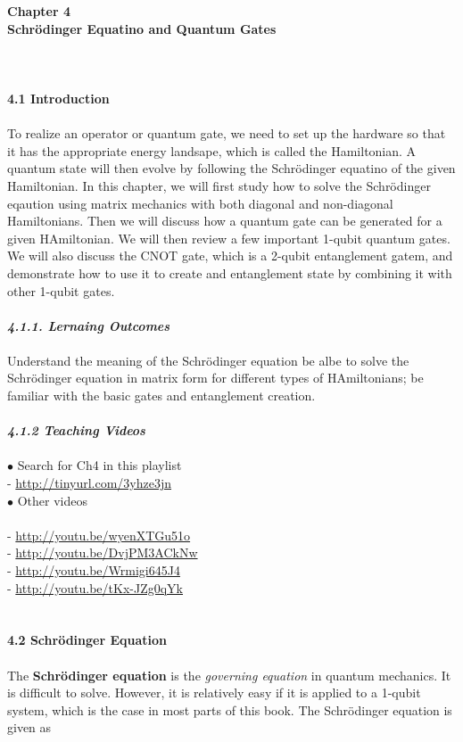 \documentclass{article}
\begin{document}
\textbf{\Large Chapter 4\\Schr\"{o}dinger Equatino and Quantum Gates}
\\\\\\\\
\textbf{\large 4.1 Introduction}
\\\\
To realize an operator or quantum gate, we need to set up the hardware so that 
it has the appropriate energy landsape, which is called the Hamiltonian. A quantum state will then 
evolve by following the Schr\"{o}dinger equatino of the given Hamiltonian.
In this chapter, we will first study how to solve the Schr\"{o}dinger eqaution using matrix mechanics with both diagonal and non-diagonal Hamiltonians.
Then we will discuss how a quantum gate can be generated for a given HAmiltonian. We will then review a few important 1-qubit quantum gates. We will also discuss the CNOT gate,
which is a 2-qubit entanglement gatem, and demonstrate how to use it to create and
entanglement state by combining it with other 1-qubit gates.
\\\\
\textbf{\textit{\large 4.1.1. Lernaing Outcomes}}\\\\
Understand the meaning of the Schr\"{o}dinger equation be albe to solve the 
Schr\"{o}dinger equation in matrix form for different types of HAmiltonians;
be familiar with the basic gates and entanglement creation.\\\\
\textit{\textbf{\large 4.1.2 Teaching Videos}}\\\\
$\bullet$ Search for Ch4 in this playlist
\\
- \url{http://tinyurl.com/3yhze3jn}\\

$\bullet$ Other videos\\\\
- \url{http://youtu.be/wyenXTGu51o}\\
- \url{http://youtu.be/DvjPM3ACkNw}\\
- \url{http://youtu.be/Wrmigi645J4}\\
- \url{http://youtu.be/tKx-JZg0qYk}\\
\\\\
\textbf{\large 4.2 Schr\"{o}dinger Equation}
\\\\
The \textbf{Schr\"{o}dinger equation} is the \textit{governing equation} in quantum
mechanics. It is difficult to solve. However, it is relatively easy if it is applied to a 1-qubit system,
which is the case in most parts of this book. The Schr\"{o}dinger equation is given as
\end{document}

